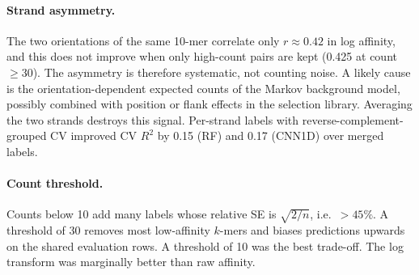 \documentclass[11pt,a4paper]{article}
\begin{document}
\paragraph{Strand asymmetry.} The two orientations of the same 10-mer correlate only $r\approx0.42$ in log affinity, and this does not improve when only high-count pairs are kept (0.425 at count $\geq$30). The asymmetry is therefore systematic, not counting noise. A likely cause is the orientation-dependent expected counts of the Markov background model, possibly combined with position or flank effects in the selection library. Averaging the two strands destroys this signal. Per-strand labels with reverse-complement-grouped CV improved CV $R^2$ by 0.15 (RF) and 0.17 (CNN1D) over merged labels.

\paragraph{Count threshold.} Counts below 10 add many labels whose relative SE is $\sqrt{2/n}$, i.e.\ $>45\%$. A threshold of 30 removes most low-affinity $k$-mers and biases predictions upwards on the shared evaluation rows. A threshold of 10 was the best trade-off. The log transform was marginally better than raw affinity.
\end{document}
